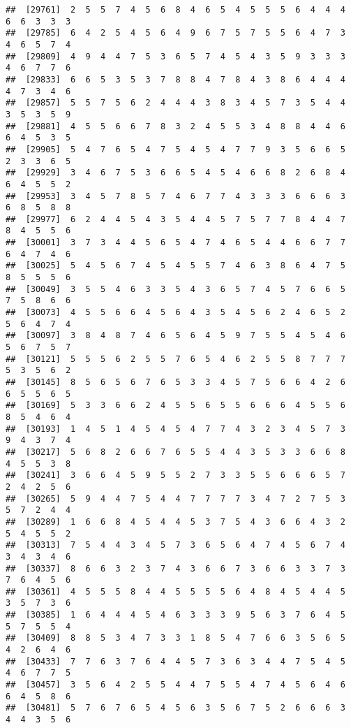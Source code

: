\documentclass[
]{book}
\begin{document}
\begin{verbatim}
##  [29761]  2  5  5  7  4  5  6  8  4  6  5  4  5  5  5  6  4  4  4  6  6  3  3  3
##  [29785]  6  4  2  5  4  5  6  4  9  6  7  5  7  5  5  6  4  7  3  4  6  5  7  4
##  [29809]  4  9  4  4  7  5  3  6  5  7  4  5  4  3  5  9  3  3  3  4  6  7  7  6
##  [29833]  6  6  5  3  5  3  7  8  8  4  7  8  4  3  8  6  4  4  4  4  7  3  4  6
##  [29857]  5  5  7  5  6  2  4  4  4  3  8  3  4  5  7  3  5  4  4  3  5  3  5  9
##  [29881]  4  5  5  6  6  7  8  3  2  4  5  5  3  4  8  8  4  4  6  6  4  5  3  5
##  [29905]  5  4  7  6  5  4  7  5  4  5  4  7  7  9  3  5  6  6  5  2  3  3  6  5
##  [29929]  3  4  6  7  5  3  6  6  5  4  5  4  6  6  8  2  6  8  4  6  4  5  5  2
##  [29953]  3  4  5  7  8  5  7  4  6  7  7  4  3  3  3  6  6  6  3  6  8  5  8  8
##  [29977]  6  2  4  4  5  4  3  5  4  4  5  7  5  7  7  8  4  4  7  8  4  5  5  6
##  [30001]  3  7  3  4  4  5  6  5  4  7  4  6  5  4  4  6  6  7  7  6  4  7  4  6
##  [30025]  5  4  5  6  7  4  5  4  5  5  7  4  6  3  8  6  4  7  5  8  5  5  5  6
##  [30049]  3  5  5  4  6  3  3  5  4  3  6  5  7  4  5  7  6  6  5  7  5  8  6  6
##  [30073]  4  5  5  6  6  4  5  6  4  3  5  4  5  6  2  4  6  5  2  5  6  4  7  4
##  [30097]  3  8  4  8  7  4  6  5  6  4  5  9  7  5  5  4  5  4  6  5  6  7  5  7
##  [30121]  5  5  5  6  2  5  5  7  6  5  4  6  2  5  5  8  7  7  7  5  3  5  6  2
##  [30145]  8  5  6  5  6  7  6  5  3  3  4  5  7  5  6  6  4  2  6  6  5  5  6  5
##  [30169]  5  3  3  6  6  2  4  5  5  6  5  5  6  6  6  4  5  5  6  8  5  4  6  4
##  [30193]  1  4  5  1  4  5  4  5  4  7  7  4  3  2  3  4  5  7  3  9  4  3  7  4
##  [30217]  5  6  8  2  6  6  7  6  5  5  4  4  3  5  3  3  6  6  8  4  5  5  3  8
##  [30241]  3  6  6  4  5  9  5  5  2  7  3  3  5  5  6  6  6  5  7  2  4  2  5  6
##  [30265]  5  9  4  4  7  5  4  4  7  7  7  7  3  4  7  2  7  5  3  5  7  2  4  4
##  [30289]  1  6  6  8  4  5  4  4  5  3  7  5  4  3  6  6  4  3  2  5  4  5  5  2
##  [30313]  7  5  4  4  3  4  5  7  3  6  5  6  4  7  4  5  6  7  4  3  4  3  4  6
##  [30337]  8  6  6  3  2  3  7  4  3  6  6  7  3  6  6  3  3  7  3  7  6  4  5  6
##  [30361]  4  5  5  5  8  4  4  5  5  5  5  6  4  8  4  5  4  4  5  3  5  7  3  6
##  [30385]  1  6  4  4  4  5  4  6  3  3  3  9  5  6  3  7  6  4  5  5  7  5  5  4
##  [30409]  8  8  5  3  4  7  3  3  1  8  5  4  7  6  6  3  5  6  5  4  2  6  4  6
##  [30433]  7  7  6  3  7  6  4  4  5  7  3  6  3  4  4  7  5  4  5  4  6  7  7  5
##  [30457]  3  5  6  4  2  5  5  4  4  7  5  5  4  7  4  5  6  4  6  6  4  5  8  6
##  [30481]  5  7  6  7  6  5  4  5  6  3  5  6  7  5  2  6  6  6  3  4  4  3  5  6

\end{verbatim}
\end{document}
